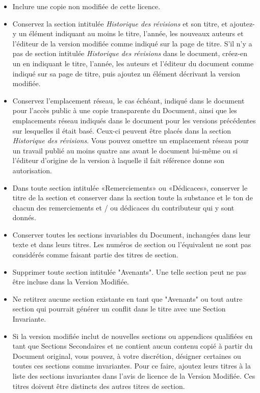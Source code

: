 \begin{itemize}
		\item Inclure une copie non modifi\'ee de cette licence.

		\item Conservez la section intitul\'ee \textit{Historique des révisions} et son titre, et ajoutez-y un \'el\'ement indiquant au moins le titre, l'ann\'ee, les nouveaux auteurs et l'\'editeur de la version modifi\'ee comme indiqu\'e sur la page de titre. S'il n'y a pas de section intitul\'ee \textit{Historique des révisions} dans le document, cr\'eez-en un en indiquant le titre, l'ann\'ee, les auteurs et l'\'editeur du document comme indiqu\'e sur sa page de titre, puis ajoutez un \'el\'ement d\'ecrivant la version modifi\'ee.

		\item Conservez l'emplacement r\'eseau, le cas \'ech\'eant, indiqu\'e dans le document pour l'accès public à une copie transparente du Document, ainsi que les emplacements r\'eseau indiqu\'es dans le document pour les versions pr\'ec\'edentes sur lesquelles il \'etait bas\'e. Ceux-ci peuvent être plac\'es dans la section \textit{Historique des révisions}. Vous pouvez omettre un emplacement r\'eseau pour un travail publi\'e au moins quatre ans avant le document lui-même ou si l'\'editeur d'origine de la version à laquelle il fait r\'ef\'erence donne son autorisation.

		\item Dans toute section intitul\'ee «Remerciements» ou «D\'edicaces», conserver le titre de la section et conserver dans la section toute la substance et le ton de chacun des remerciements et / ou d\'edicaces du contributeur qui y sont donn\'es.

		\item Conserver toutes les sections invariables du Document, inchang\'ees dans leur texte et dans leurs titres. Les num\'eros de section ou l'\'equivalent ne sont pas consid\'er\'es comme faisant partie des titres de section.

		\item  Supprimer toute section intitul\'ee "Avenants". Une telle section peut ne pas être incluse dans la Version Modifi\'ee.

		\item Ne retitrez aucune section existante en tant que "Avenants" ou tout autre section qui pourrait g\'en\'erer un conflit dans le titre avec une Section Invariante.

		\item Si la version modifi\'ee inclut de nouvelles sections ou appendices qualifi\'ees en tant que Sections Secondaires et ne contient aucun contenu copi\'e à partir du Document original, vous pouvez, à votre discr\'etion, d\'esigner certaines ou toutes ces sections comme invariantes. Pour ce faire, ajoutez leurs titres à la liste des sections invariantes dans l'avis de licence de la Version Modifi\'ee. Ces titres doivent être distincts des autres titres de section.


\end{itemize}

